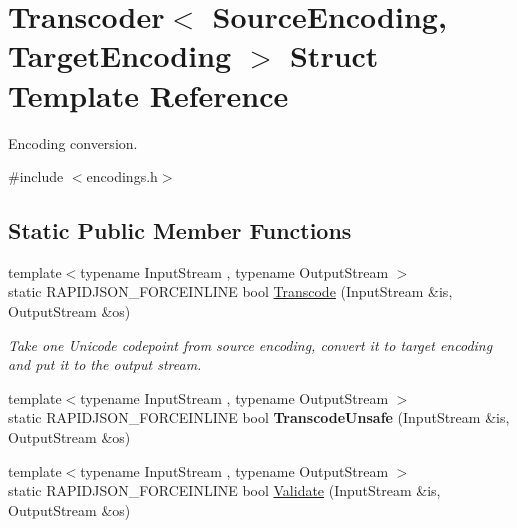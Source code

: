 \hypertarget{struct_transcoder}{}\section{Transcoder$<$ Source\+Encoding, Target\+Encoding $>$ Struct Template Reference}
\label{struct_transcoder}


Encoding conversion.  




{\ttfamily \#include $<$encodings.\+h$>$}

\subsection*{Static Public Member Functions}
\begin{DoxyCompactItemize}
\item 
{\footnotesize template$<$typename Input\+Stream , typename Output\+Stream $>$ }\\static R\+A\+P\+I\+D\+J\+S\+O\+N\+\_\+\+F\+O\+R\+C\+E\+I\+N\+L\+I\+NE bool \hyperlink{struct_transcoder_a0ea2edfe35784ebf1063921d2bd5fb66}{Transcode} (Input\+Stream \&is, Output\+Stream \&os)\hypertarget{struct_transcoder_a0ea2edfe35784ebf1063921d2bd5fb66}{}\label{struct_transcoder_a0ea2edfe35784ebf1063921d2bd5fb66}

\begin{DoxyCompactList}\small\item\em Take one Unicode codepoint from source encoding, convert it to target encoding and put it to the output stream. \end{DoxyCompactList}\item 
{\footnotesize template$<$typename Input\+Stream , typename Output\+Stream $>$ }\\static R\+A\+P\+I\+D\+J\+S\+O\+N\+\_\+\+F\+O\+R\+C\+E\+I\+N\+L\+I\+NE bool {\bfseries Transcode\+Unsafe} (Input\+Stream \&is, Output\+Stream \&os)\hypertarget{struct_transcoder_a16345a912c679b2ea197328eb1444f82}{}\label{struct_transcoder_a16345a912c679b2ea197328eb1444f82}

\item 
{\footnotesize template$<$typename Input\+Stream , typename Output\+Stream $>$ }\\static R\+A\+P\+I\+D\+J\+S\+O\+N\+\_\+\+F\+O\+R\+C\+E\+I\+N\+L\+I\+NE bool \hyperlink{struct_transcoder_a8a64aa837f7962894a99f63232472543}{Validate} (Input\+Stream \&is, Output\+Stream \&os)\hypertarget{struct_transcoder_a8a64aa837f7962894a99f63232472543}{}\label{struct_transcoder_a8a64aa837f7962894a99f63232472543}


\end{DoxyCompactItemize}
